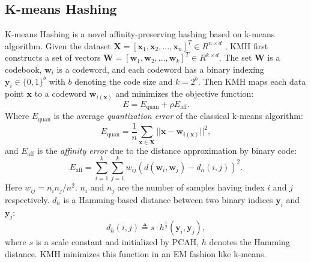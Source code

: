 \documentclass{article}
\begin{document}
\subsection{K-means Hashing}
K-means Hashing is a novel affinity-preserving hashing based on k-means algorithm. Given the dataset $\mathbf{X} = [\mathbf{x}_{1}, \mathbf{x}_{2},...,\mathbf{x}_{n}]^{T} \in R^{n\times d}$ ,
KMH first constructs a set of vectors $\mathbf{W} = [\mathbf{w}_{1},  \mathbf{w}_{2}, ..., \mathbf{w}_{k}]^{T} \in R^{k\times d}$.
The set $\mathbf{W}$ is a codebook, $\mathbf{w}_{i}$ is a codeword, and each codeword has a binary indexing $\mathbf{y}_{i}\in \{0, 1\}^{b}$ with $b$ denoting the code size and $k=2^{b}$. Then KMH maps each data point $\mathbf{x}$ to a codeword $\mathbf{w}_{i(\mathbf{x})}$ and minimizes the objective function:
\begin{equation}\label{4}
E = E_{\mathrm{quan}} + \rho E_{\mathrm{aff}}.
\end{equation}
Where $E_{\mathrm{quan}}$ is the average \emph{quantization error} of the classical k-means algorithm:
\begin{equation}\label{1}
E_{\mathrm{quan}} = \frac{1}{n}\sum_{\mathbf{x}\in \mathbf{X}} ||\mathbf{x}-\mathbf{w}_{i(\mathbf{x})}||^{2},
\end{equation}
and $E_{\mathrm{aff}}$ is the \emph{affinity error} due to the distance approximation by binary code:
\begin{equation}
E_{\mathrm{aff}}= \sum_{i=1}^{k}\sum_{j=1}^{k}w_{ij}(d(\mathbf{w}_{i}, \mathbf{w}_{j}) - d_{h}(i, j))^2.
\end{equation}
Here $w_{ij} = n_{i}n_{j}/n^{2}$. $n_{i}$ and $n_{j}$ are the number of samples having index $i$ and $j$ respectively. $d_{h}$ is a Hamming-based distance between two binary indices $\mathbf{y}_{i}$ and $\mathbf{y}_{j}$:
\begin{equation}\label{d_h}
d_{h}(i,j) \triangleq s \cdot h^{\frac{1}{2}}(\mathbf{y}_{i},\mathbf{y}_{j}),
\end{equation}
where $s$ is a scale constant and initialized by PCAH, $h$ denotes the Hamming distance.
KMH minimizes this function in an EM fashion like k-means.
\end{document}
